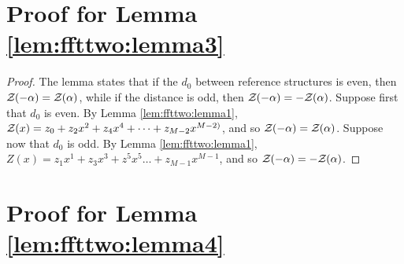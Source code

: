 \documentclass[11pt, oneside]{Thesis} %
\begin{document}
\section{Proof for Lemma \ref{lem:ffttwo:lemma3}}
\label{sec:ffttwo:lemma3proof}

\begin{proof}
The lemma states that if the \bpd $d_0$ between reference
structures \strAB is even, then ${\mathcal Z}_{}(-\alpha)={\mathcal Z}_{}(\alpha)$, while if
the distance is odd, then ${\mathcal Z}_{}(-\alpha)=-{\mathcal Z}_{}(\alpha)$.
Suppose first that $d_0$ is even. By Lemma \ref{lem:ffttwo:lemma1},
${\mathcal Z}_{}(x) = z_0 + z_2 x^2 + z_4 x^4 + \dots +
z_{M-2} x^{M-2)}$, and so ${\mathcal Z}_{}(-\alpha)={\mathcal Z}_{}(\alpha)$.
Suppose now that
$d_0$ is odd. By Lemma \ref{lem:ffttwo:lemma1},
$Z(x) = z_1 x^1 + z_3 x^3 + z^5 x^5 \dots +
z_{M-1} x^{M-1}$, and so ${\mathcal Z}_{}(-\alpha)=-{\mathcal Z}_{}(\alpha)$.
\end{proof}

\section{Proof for Lemma \ref{lem:ffttwo:lemma4}}
\label{sec:ffttwo:lemma4proof}
\end{document}
